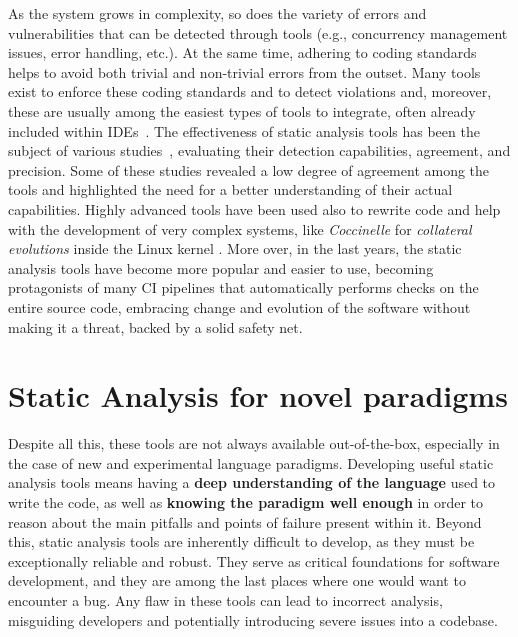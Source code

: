 \documentclass[12pt,a4paper,openright,twoside]{book}
\begin{document}
As the system grows in complexity, so does the variety of errors and
vulnerabilities that can be detected through tools (e.g., concurrency management
issues, error handling, etc.). At the same time, adhering to coding standards
helps to avoid both trivial and non-trivial errors from the outset.
Many tools exist to enforce these coding standards and to detect violations and,
moreover, these are usually among the easiest types of tools to integrate, often
already included within \acp{IDE}~\cite{DBLP:journals/queue/Thomson21}.
%
The effectiveness of static analysis tools has been the subject of various
studies~\cite{DBLP:journals/jss/LenarduzziPSLP23}, evaluating their detection
capabilities, agreement, and precision. Some of these studies revealed a low
degree of agreement among the tools and highlighted the need for a better
understanding of their actual capabilities. Highly advanced tools have been used
also to rewrite code and help with the development of very complex systems, like
\emph{Coccinelle} for \emph{collateral evolutions} inside the Linux kernel
\cite{DBLP:conf/eurosys/PadioleauLHM08}.
%
More over, in the last years, the static analysis tools have become more popular
and easier to use, becoming protagonists of many \ac{CI} pipelines
\cite{DBLP:conf/msr/ZampettiSOCP17} that automatically performs checks on the
entire source code, embracing change and evolution of the software without
making it a threat, backed by a solid safety net. 

\section{Static Analysis for novel paradigms}

Despite all this, these tools are not always available out-of-the-box,
especially in the case of new and experimental language paradigms. Developing
useful static analysis tools means having a \textbf{deep understanding of the
language} used to write the code, as well as \textbf{knowing the paradigm well
enough} in order to reason about the main pitfalls and points of failure present
within it.
%
Beyond this, static analysis tools are inherently difficult to develop, as they
must be exceptionally reliable and robust. They serve as critical foundations
for software development, and they are among the last places where one would
want to encounter a bug. Any flaw in these tools can lead to incorrect analysis,
misguiding developers and potentially introducing severe issues into a codebase.
\end{document}
